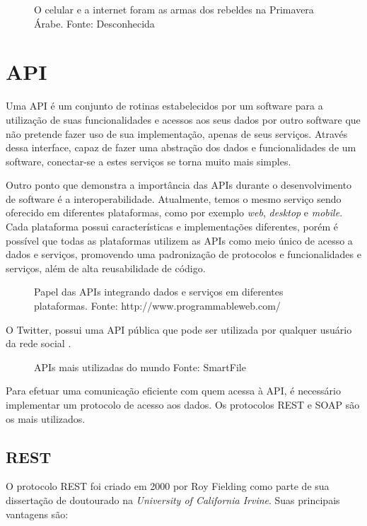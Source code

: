 \begin{figure}[H]
	\centering{}
	\caption{O celular e a internet foram as armas dos rebeldes na Primavera Árabe. Fonte: Desconhecida}
	\label{uni}
\end{figure}

\section{API}\label{sec:api}

Uma API é um conjunto de rotinas estabelecidos por um software para a utilização de suas funcionalidades e acessos aos seus dados por outro software que não pretende fazer uso de sua implementação, apenas de seus serviços. Através dessa interface, capaz de fazer uma abstração dos dados e funcionalidades de um software, conectar-se a estes serviços se torna muito mais simples.

Outro ponto que demonstra a importância das APIs durante o desenvolvimento de software é a interoperabilidade. Atualmente, temos o mesmo serviço sendo oferecido em diferentes plataformas, como por exemplo \textit{web}, \textit{desktop} e \textit{mobile}. Cada plataforma possui características e implementações diferentes, porém é possível que todas as plataformas utilizem as APIs como meio único de acesso a dados e serviços, promovendo uma padronização de protocolos e funcionalidades e serviços, além de alta reusabilidade de código.

\begin{figure}[H]
	\centering{}
	\caption{Papel das APIs integrando dados e serviços em diferentes plataformas. Fonte: http://www.programmableweb.com/}
	\label{uni}
\end{figure}

O Twitter, possui uma API pública que pode ser utilizada por qualquer usuário da rede social \cite{twitterapidocs}. 

\begin{figure}[H]
	\centering{}
	\caption{APIs mais utilizadas do mundo Fonte: SmartFile}
	\label{uni}
\end{figure}

Para efetuar uma comunicação eficiente com quem acessa à API, é necessário implementar um protocolo de acesso aos dados. Os protocolos \ac{REST} e \ac{SOAP} são os mais utilizados.

\subsection{REST}
O protocolo REST foi criado em 2000 por Roy Fielding \cite{fieldingrest} como parte de sua dissertação de doutourado na \textit{University of California Irvine}. Suas principais vantagens são:

